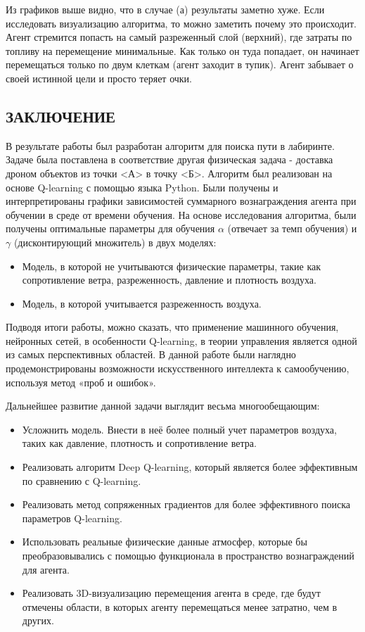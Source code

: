 \documentclass[a4paper]{report}
\theoremstyle{definition}
\theoremstyle{plain}
\theoremstyle{remark}
\theoremstyle{remark}
\theoremstyle{definition}
\begin{document}
Из графиков выше видно, что в случае (а) результаты заметно хуже. Если исследовать визуализацию алгоритма, то можно заметить почему это происходит. Агент стремится попасть на самый разреженный слой (верхний), где затраты по топливу на перемещение минимальные. Как только он туда попадает, он начинает перемещаться только по двум клеткам (агент заходит в тупик). Агент забывает о своей истинной цели и просто теряет очки.

\newpage
\begin{center}
    \section*{ЗАКЛЮЧЕНИЕ}
\end{center}

В результате работы был разработан алгоритм для поиска пути в лабиринте. Задаче была поставлена в соответствие другая физическая задача - доставка дроном объектов из точки <А> в точку <Б>. Алгоритм был реализован на основе Q-learning с помощью языка Python. Были получены и интерпретированы графики зависимостей суммарного вознаграждения агента при обучении в среде от времени обучения. На основе исследования алгоритма, были получены оптимальные параметры для обучения $\alpha$ (отвечает за темп обучения) и $\gamma$ (дисконтирующий множитель) в двух моделях:
\begin{itemize}
    \item Модель, в которой не учитываются физические параметры, такие как сопротивление ветра, разреженность, давление и плотность воздуха.
    \item Модель, в которой учитывается разреженность воздуха.
\end{itemize}

Подводя итоги работы, можно сказать, что применение машинного обучения, нейронных сетей, в особенности Q-learning, в теории управления является одной из самых перспективных областей. В данной работе были наглядно продемонстрированы возможности искусственного интеллекта к самообучению, используя метод «проб и ошибок».

Дальнейшее развитие данной задачи выглядит весьма многообещающим:
\begin{itemize}
    \item Усложнить модель. Внести в неё более полный учет параметров воздуха, таких как давление, плотность и сопротивление ветра.
    \item Реализовать алгоритм Deep Q-learning, который является более эффективным по сравнению с Q-learning.
    \item Реализовать метод сопряженных градиентов для более эффективного поиска параметров Q-learning.
    \item Использовать реальные физические данные атмосфер, которые бы преобразовывались с помощью функционала в пространство вознаграждений для агента.
     \item Реализовать 3D-визуализацию перемещения агента в среде, где будут отмечены области, в которых агенту перемещаться менее затратно, чем в других.
\end{itemize}
\end{document}

